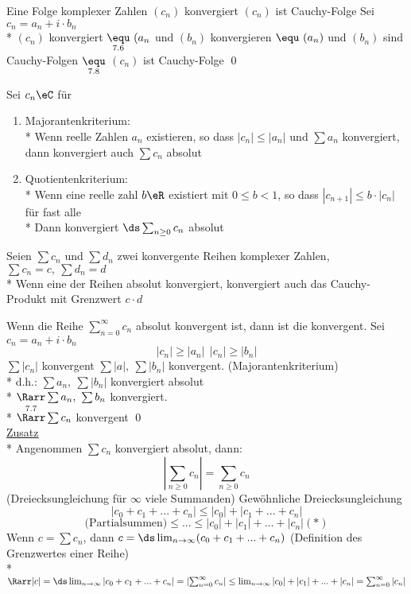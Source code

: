 Eine Folge komplexer Zahlen $(c_n)$ konvergiert \equ{} $(c_n)$ ist Cauchy-Folge
\bew
	Sei $c_n = a_n + i \cdot b_n$\\*
	$(c_n)$ konvergiert $\underset{7.6}{\equ} \ (a_n$ und $(b_n)$ konvergieren $\equ \ (a_n)$ und $(b_n)$ sind Cauchy-Folgen $\underset{7.8}{\equ}$ $(c_n)$ ist Cauchy-Folge \qed

Sei $c_n\eC$ für \nN
\begin{enumerate}
\item{Majorantenkriterium:\\*
Wenn reelle Zahlen $a_n$ existieren, so dass $|c_n|\leq |a_n|$ und $\sum a_n$ konvergiert, dann konvergiert auch $\sum c_n$ absolut}
\item{Quotientenkriterium:\\*
Wenn eine reelle zahl $b\eR$ existiert mit $0\leq b<1$, so dass $|c_{n+1}|\leq b·|c_n|$ für fast alle \nN\\*
Dann konvergiert $\ds\sum_{n\geq 0} c_n$ absolut}
\end{enumerate}

Seien $\sum c_n$ und $\sum d_n$ zwei konvergente Reihen komplexer Zahlen, $\sum c_n=c,\ \sum d_n=d$\\*
Wenn eine der Reihen absolut konvergiert, konvergiert auch das Cauchy-Produkt mit Grenzwert $c·d$

Wenn die Reihe $\sum_{n = 0}^{\infty} c_n$ absolut konvergent ist, dann ist die konvergent.
\bew
Sei $c_n = a_n + i \cdot b_n$ $$|c_n| \geq |a_n|\ \ |c_n| \geq |b_n|$$
$\sum |c_n|$ konvergent \Rarr $\sum |a|,\ \sum |b_n|$ konvergent. (Majorantenkriterium)\\*
d.h.: $\sum a_n,\ \sum |b_n|$ konvergiert absolut\\*
$\Rarr \sum a_n,\ \sum b_n$ konvergiert.\\*
$\overset{7.7}{\Rarr} \sum c_n$ konvergent \qed\\
\ul{Zusatz}\\*
Angenommen $\sum c_n$ konvergiert absolut, dann: 
$$\left| \sum_{n \geq 0} c_n \right| = \sum_{n \geq 0} c_n$$
(Dreiecksungleichung für $\infty$ viele Summanden)
\bew
Gewöhnliche Dreiecksungleichung \Rarr
$$|c_0 + c_1 + ... + c_n| \leq |c_0| + |c_1 + ... + c_n|$$
$$\text{(Partialsummen)} \leq ... \leq |c_0| + |c_1| + ... + |c_n| (*)$$
Wenn $c = \sum c_n$, dann $c = \ds\lim_{n \to \infty} (c_0 + c_1 + ... + c_n)$ (Definition des Grenzwertes einer Reihe)\\*
$\Rarr |c| = \ds\lim_{n \to \infty} |c_0 + c_1 + ... + c_n| = \left| \sum_{n = 0}^{\infty} c_n \right| \leq \lim_{n \to \infty} |c_0| + |c_1| + ... + |c_n| = \sum_{n = 0}^{\infty} |c_n|$